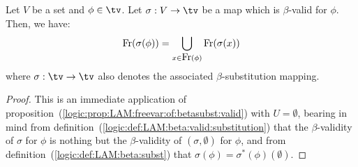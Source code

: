 \begin{prop}\label{logic:prop:LAM:freevar:of:betasubst:valid}
    Let $V$ be a set and $\phi\in\tv$. Let $\sigma:V\to\tv$ be a map which is 
    $\beta$-valid for $\phi$. Then, we have: 
    \[
        \mbox{\rm Fr}(\sigma(\phi))
        =
        \bigcup_{x\in\mbox{\rm Fr}(\phi)}\mbox{\rm Fr}(\sigma(x))
    \]
    where $\sigma:\tv\to\tv$ also denotes the associated $\beta$-substitution
    mapping.
\end{prop}
\begin{proof}
    This is an immediate application of
    proposition~(\ref{logic:prop:LAM:freevar:of:betasubst:valid}) with
    $U=\emptyset$, bearing in mind from
    definition~(\ref{logic:def:LAM:beta:valid:substitution}) that the 
    $\beta$-validity of $\sigma$ for $\phi$ is nothing but the $\beta$-validity
    of $(\sigma,\emptyset)$ for $\phi$, and from
    definition~(\ref{logic:def:LAM:beta:subst}) that $\sigma(\phi)=
    \sigma^{*}(\phi)(\emptyset)$.
\end{proof}

